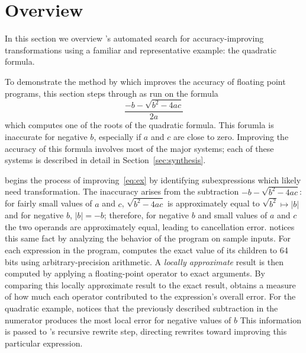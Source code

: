 \documentclass[paper.tex]{subfiles}
\begin{document}
\section{Overview}
\label{sec:overview}

In this section we overview \casio's automated search for
accuracy-improving transformations using a familiar and representative
example: the quadratic formula.

To demonstrate the method by which \casio improves the accuracy of
floating point programs, this section steps through \casio as run on
the formula
\begin{equation}\label{eq:ex}
  \frac{-b - \sqrt{b^2 - 4ac}}
       {2a}
\end{equation}
which computes one of the roots of the quadratic formula.  This
forumla is inaccurate for negative $b$, especially if $a$ and $c$ are
close to zero.  Improving the accuracy of this formula involves most
of the major systems; each of these systems is described in detail in
Section~\ref{sec:synthesis}.

\casio begins the process of improving~\eqref{eq:ex} by identifying
subexpressions which likely need transformation.  The inaccuracy
arises from the subtraction $-b - \sqrt{b^2 - 4ac}$: for fairly
small values of $a$ and $c$, $\sqrt{b^2 - 4ac}$ is approximately
equal to $\sqrt{b^2} \mapsto |b|$ and for negative $b$, $|b| = -b$;
therefore, for negative $b$ and small values of $a$ and $c$ the two
operands are approximately equal, leading to cancellation error.
\casio notices this same fact by analyzing the behavior of the program
on sample inputs.  For each expression in the program, \casio computes
the exact value of its children to 64 bits using arbitrary-precision
arithmetic.  A \emph{locally approximate} result is then computed by
applying a floating-point operator to exact arguments.  By comparing
this locally approximate result to the exact result, \casio obtains a
measure of how much each operator contributed to the expression's
overall error.  For the quadratic example, \casio notices that the
previously described subtraction in the numerator produces the most
local error for negative values of $b$ This information is passed to
\casio's recursive rewrite step, directing rewrites toward improving
this particular expression.
\end{document}
